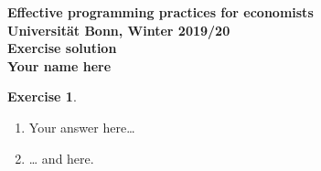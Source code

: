 \documentclass[11pt,a4paper,leqno]{article}
\theoremstyle{definition}
\newtheorem{exercise}{Exercise}
\begin{document}
\begin{center}
    \begin{large}
        \textbf{
        Effective programming practices for economists\\
        Universität Bonn, Winter 2019/20 \\[2ex]
        Exercise solution\\[2ex]
        Your name here
        }
    \end{large}
\end{center}


\begin{exercise}
    ~ %
    \begin{enumerate}
        \item Your answer here\ldots
        \item {\ldots} and here.
    \end{enumerate}
\end{exercise}


\end{document}
